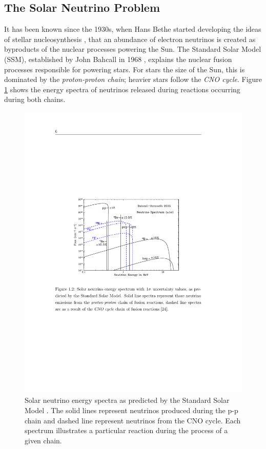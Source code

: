 \subsection{The Solar Neutrino Problem}\label{SolarNeutrinoProblem}

It has been known since the 1930s, when Hans Bethe started developing the ideas of stellar nucleosynthesis \cite{Bethe1939}, that an abundance of electron neutrinos is created as byproducts of the nuclear processes powering the Sun.  The Standard Solar Model (SSM), established by John Bahcall in 1968 \cite{Bahcall1968}, explains the nuclear fusion processes responsible for powering stars.  For stars the size of the Sun, this is dominated by the \textit{proton-proton chain}; heavier stars follow the \textit{CNO cycle}.  Figure \ref{fig:SolarNeutrinoCycles} shows the energy spectra of neutrinos released during reactions occurring during both chains.

\begin{figure}
\centering
  \includegraphics[width=12cm]{SolarNeutrinoCycles.pdf}
  \caption{Solar neutrino energy spectra as predicted by the Standard Solar Model \cite{Bahcall2005}.  The solid lines represent neutrinos produced during the p-p chain and dashed line represent neutrinos from the CNO cycle.  Each spectrum illustrates a particular reaction during the process of a given chain.}
  \label{fig:SolarNeutrinoCycles}
\end{figure}


